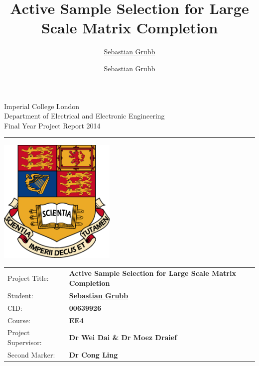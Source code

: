 \documentclass[oneside,11pt]{Classes/CUEDthesisPSnPDF}
\title{Active Sample Selection for Large Scale Matrix Completion}
\author{\href{mailto:sg3510@ic.ac.uk}{Sebastian Grubb}}
\author{Sebastian Grubb}
\newcounter{col}
\begin{document}
\begin{titlepage}
\setlength{\parindent}{0pt}
\setlength{\parskip}{0pt}

{
\Large
\raggedright
Imperial College London\\[12pt]
Department of Electrical and Electronic Engineering\\[12pt]
Final Year Project Report 2014\\[12pt]

}
\rule{\columnwidth}{3pt}

\vfill

\centering
\includegraphics[width=0.6\columnwidth,height=60mm,keepaspectratio]{ThesisFigs/imperial_crest.eps}

\vfill

\setlength{\tabcolsep}{0pt}
\begin{tabular}{p{40mm}p{\dimexpr\columnwidth-40mm}}
Project Title: & \textbf{Active Sample Selection for Large Scale Matrix Completion} \\[12pt]
Student: & \textbf{\href{mailto:sg3510@ic.ac.uk}{Sebastian Grubb}} \\[12pt]
CID: & \textbf{00639926} \\[12pt]
Course: & \textbf{EE4} \\[12pt]
Project Supervisor: & \textbf{Dr Wei Dai \& Dr Moez Draief} \\[12pt]
Second Marker: & \textbf{Dr Cong Ling} \\
\end{tabular}
\end{titlepage}

%   
\end{document}

